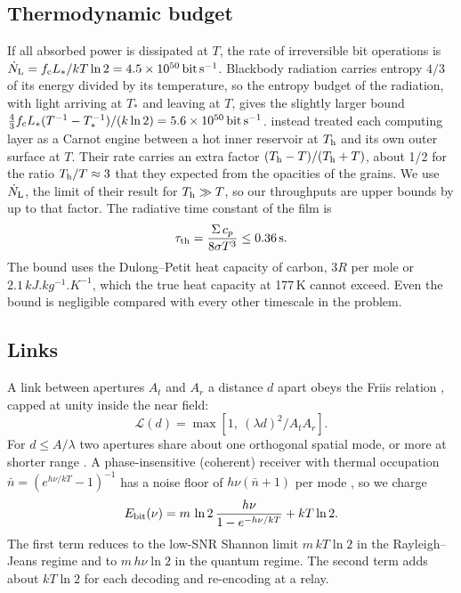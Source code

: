 \documentclass[final,5p]{elsarticle}
\newcommand{\kTl}{kT\ln 2}
\begin{document}
\subsection{Thermodynamic budget}
If all absorbed power is dissipated at $T$, the rate of irreversible bit operations is $\dot N_{\rm L} = f_{\rm c}L_\ast/\kTl = 4.5\times10^{50}\,{\rm bit\,s^{-1}}$. Blackbody radiation carries entropy $4/3$ of its energy divided by its temperature, so the entropy budget of the radiation, with light arriving at $T_\ast$ and leaving at $T$, gives the slightly larger bound $\tfrac43 f_{\rm c}L_\ast(T^{-1}-T_\ast^{-1})/(k\ln2)=5.6\times10^{50}\,{\rm bit\,s^{-1}}$. \citet{LaughlinAdams2021} instead treated each computing layer as a Carnot engine between a hot inner reservoir at $T_{\rm h}$ and its own outer surface at $T$. Their rate carries an extra factor $(T_{\rm h}-T)/(T_{\rm h}+T)$, about 1/2 for the ratio $T_{\rm h}/T\approx3$ that they expected from the opacities of the grains. We use $\dot N_{\rm L}$, the limit of their result for $T_{\rm h}\gg T$, so our throughputs are upper bounds by up to that factor. The radiative time constant of the film is
\begin{equation}
\tau_{\rm th} = \frac{\Sigma\,c_p}{8\sigma T^3}\le 0.36\,{\rm s}.
\end{equation}
The bound uses the Dulong--Petit heat capacity of carbon, $3R$ per mole or $2.1\,\si{kJ.kg^{-1}.K^{-1}}$, which the true heat capacity at 177\,K cannot exceed. Even the bound is negligible compared with every other timescale in the problem.

\subsection{Links}
A link between apertures $A_t$ and $A_r$ a distance $d$ apart obeys the Friis relation \citep{Friis1946}, capped at unity inside the near field:
\begin{equation}
\mathcal{L}(d) = \max\!\left[1,\ (\lambda d)^2/A_tA_r\right].
\end{equation}
For $d\le A/\lambda$ two apertures share about one orthogonal spatial mode, or more at shorter range \citep{Miller2000}. A phase-insensitive (coherent) receiver with thermal occupation $\bar n=(e^{h\nu/kT}-1)^{-1}$ has a noise floor of $h\nu(\bar n+1)$ per mode \citep{Caves1982}, so we charge
\begin{equation}
E_{\rm bit}(\nu) = m\,\ln2\,\frac{h\nu}{1-e^{-h\nu/kT}} + \kTl.
\label{eq:ebit}
\end{equation}
The first term reduces to the low-SNR Shannon limit $m\,\kTl$ in the Rayleigh--Jeans regime \citep{Shannon1948} and to $m\,h\nu\ln2$ in the quantum regime. The second term adds about $\kTl$ for each decoding and re-encoding at a relay.
\end{document}
